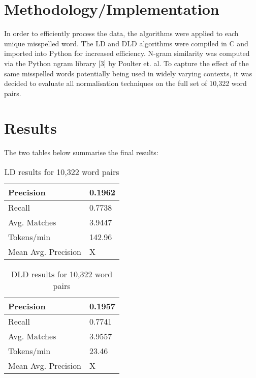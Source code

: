 \documentclass[11pt]{article}
\begin{document}
\section{Methodology/Implementation}
In order to efficiently process the data, the algorithms were applied to each unique misspelled word.
The LD and DLD algorithms were compiled in C and imported into Python for increased efficiency. N-gram
similarity was computed via the Python ngram library [3] by Poulter et. al. To capture the effect of the same misspelled words potentially being used in widely varying contexts, it was decided to evaluate all normalisation techniques on the full set of 10,322 word pairs. 


\section{Results}
The two tables below summarise the final results:

\begin{table}[h]
\begin{center}
\begin{tabular}{|l|l|}
      \hline
      Precision & 0.1962\\
      \hline
      Recall & 0.7738\\
      \hline
      Avg. Matches & 3.9447\\
      \hline
      Tokens/min & 142.96\\
      \hline
      Mean Avg. Precision & X\\
      \hline
\end{tabular}
\caption{LD results for 10,322 word pairs}\label{table1}
\end{center}
\end{table}


\begin{table}[h]
\begin{center}
\begin{tabular}{|l|l|}
      \hline
      Precision & 0.1957\\
      \hline
      Recall & 0.7741\\
      \hline
      Avg. Matches & 3.9557\\
      \hline
      Tokens/min & 23.46\\
      \hline
      Mean Avg. Precision & X\\
      \hline
\end{tabular}
\caption{DLD results for 10,322 word pairs}\label{table2}
\end{center}
\end{table}
\end{document}
